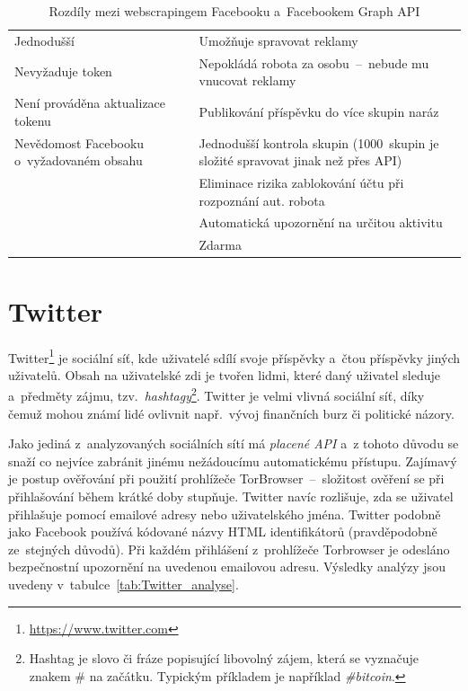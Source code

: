 \begin{table}[H]
\begin{tabularx}{\linewidth}{
    |>{\hsize=1\hsize}X|%
    >{\hsize=1\hsize}X|%
  }
\hline

\multicolumn{1}{|c|}{\textbf{Webscraping}} & \multicolumn{1}{|c|}{\textbf{Facebook Graph API}} \\ \hline
Jednodušší & Umožňuje spravovat reklamy \\ \hline
Nevyžaduje token & Nepokládá robota za osobu~--~nebude mu vnucovat reklamy \\ \hline
Není prováděna aktualizace tokenu & Publikování příspěvku do více skupin naráz \\ \hline
Nevědomost Facebooku o~vyžadovaném obsahu &  Jednodušší kontrola skupin (1000~skupin je složité spravovat jinak než přes API)\\ \hline
& Eliminace rizika zablokování účtu při rozpoznání aut. robota \\ \hline
& Automatická upozornění na určitou aktivitu \\ \hline
& Zdarma \\ \hline
\end{tabularx}

\caption{Rozdíly mezi webscrapingem Facebooku a~Facebookem Graph API}
\label{tab:FB_API_vs_webscraping}
\end{table}

\section{Twitter}
Twitter\footnote{\href{https://www.twitter.com}{https://www.twitter.com}} je sociální síť, kde uživatelé sdílí svoje příspěvky a~čtou příspěvky jiných uživatelů. Obsah na uživatelské zdi je tvořen lidmi, které daný uživatel sleduje a~předměty zájmu, tzv.~\textit{hashtagy}\footnote{Hashtag je slovo či fráze popisující libovolný zájem, která se vyznačuje znakem \# na začátku. Typickým příkladem je například \textit{\#bitcoin}.}. Twitter je velmi vlivná sociální síť, díky čemuž mohou známí lidé ovlivnit např.~vývoj finančních burz či politické názory.

Jako jediná z~analyzovaných sociálních sítí má \textit{placené API} a~z tohoto důvodu se snaží co nejvíce zabránit jinému nežádoucímu automatickému přístupu. Zajímavý je postup ověřování při použití prohlížeče TorBrowser~--~složitost ověření se při přihlašování během krátké doby stupňuje. Twitter navíc rozlišuje, zda se uživatel přihlašuje pomocí emailové adresy nebo uživatelského jména. Twitter podobně jako Facebook používá kódované názvy HTML identifikátorů (pravděpodobně ze~stejných důvodů). Při každém přihlášení z~prohlížeče Torbrowser je odesláno bezpečnostní upozornění na uvedenou emailovou adresu. Výsledky analýzy jsou uvedeny v~tabulce~\ref{tab:Twitter_analyse}.

